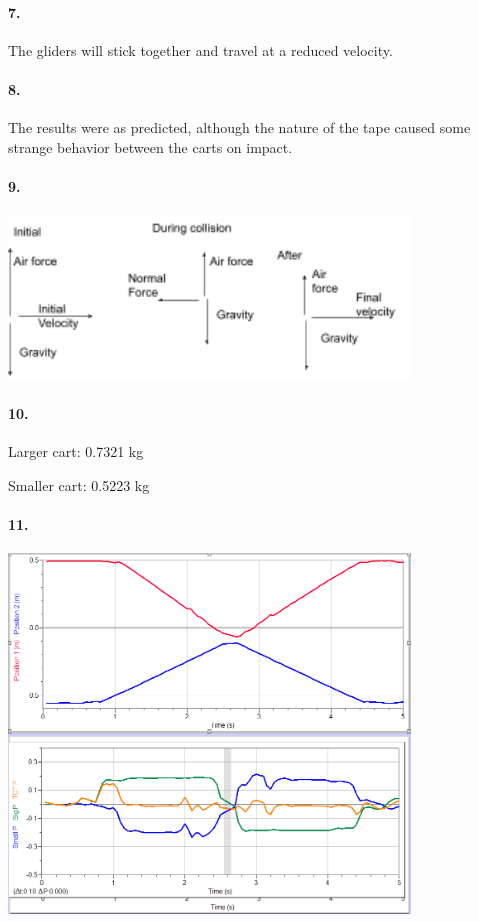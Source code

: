     \paragraph*{7.}

    The gliders will stick together and travel at a reduced velocity.

    \paragraph*{8.}

    The results were as predicted, although the nature of the tape caused some strange behavior between the carts on impact.

    \pagebreak

    \paragraph*{9.}\mbox{}

    {\centering\includegraphics[width=0.8\textwidth]{image12.png}}

    \paragraph*{10.}

    Larger cart: 0.7321 kg

    Smaller cart: 0.5223 kg

    \paragraph*{11.}\mbox{}

    {\centering\includegraphics[width=0.8\textwidth]{image4.png}}

